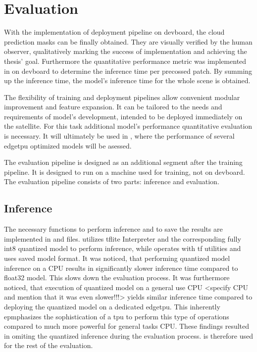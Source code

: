 {\section{Evaluation}
\label{sec:evaluation}

With the implementation of deployment pipeline on \gls{devboard}, the cloud prediction masks can be finally obtained.
They are visually verified by the human observer, qualitatively marking the success of implementation and achieving the thesis' goal.
Furthermore the quantitative performance metric was implemented in  on \gls{devboard} to determine the inference time per precossed patch.
By summing up the inference time, the model's inference time for the whole scene is obtained.

The flexibility of training and deployment pipelines allow convenient modular improvement and feature expansion.
It can be tailored to the needs and requirements of model's development, intended to be deployed immediately on the satellite.
For this task additional model's performance quantitative evaluation is necessary.
It will ultimately be used in , where the performance of several \gls{edgetpu} optimized models will be asessed.

The evaluation pipeline is designed as an additional segment after the training pipeline. It is designed to run on a machine used for training, not on \gls{devboard}.
The evaluation pipeline consists of two parts: inference and evaluation.

\subsection*{Inference}

The necessary functions to perform inference and to save the results are implemented in  and  files.
 utilizes \gls{tflite} Interpreter and the corresponding fully \gls{int8} quantized  model to perform inference,
while  operates with \gls{tf} utilities and uses  saved model format.
It was noticed, that performing quantized model inference on a CPU results in significantly slower inference time compared to  \gls{float32} model.
This slows down the evaluation process. It was furthermore noticed,
that execution of quantized model on a general use CPU <specify CPU and mention that it was even slower!!!> yields similar inference time
compared to deploying the quantized model on a dedicated \gls{edgetpu}. This inherently epmphasizes the sophistication of a \gls{tpu} to perform
this type of operations compared to much more powerful for general tasks CPU. These findings resulted in omiting the quantized inference during the evaluation process.
 is therefore used for the rest of the evaluation.

}
